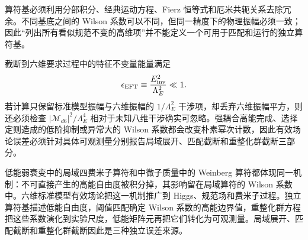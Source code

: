 算符基必须利用分部积分、经典运动方程、Fierz 恒等式和厄米共轭关系去除冗余。不同基底之间的 Wilson 系数可以不同，但同一精度下的物理振幅必须一致；因此“列出所有看似规范不变的高维项”并不能定义一个可用于匹配和运行的独立算符基。

截断到六维要求过程中的特征不变量能量满足
\begin{equation*}
\epsilon_{\rm EFT}\equiv\frac{E_{\rm inv}^2}{\Lambda_E^2}\ll1.
\end{equation*}
若计算只保留标准模型振幅与六维振幅的 $1/\Lambda_E^2$ 干涉项，却丢弃六维振幅平方，则还必须检查 $|\mathcal M_{d6}|^2/\Lambda_E^4$ 相对于未知八维干涉确实可忽略。强耦合高能完成、选择定则造成的低阶抑制或异常大的 Wilson 系数都会改变朴素幂次计数，因此有效场论误差必须针对具体可观测量分别报告局域展开、匹配截断和重整化群截断三部分。

低能弱衰变中的局域四费米子算符和中微子质量中的 Weinberg 算符都体现同一机制：不可直接产生的高能自由度被积分掉，其影响留在局域算符的 Wilson 系数中。六维标准模型有效场论把这一机制推广到 Higgs、规范场和费米子过程。独立算符基描述低能自由度，阈值匹配确定 Wilson 系数的高能边界值，重整化群方程把这些系数演化到实验尺度，低能矩阵元再把它们转化为可观测量。局域展开、匹配截断和重整化群截断因此是三种独立误差来源。













